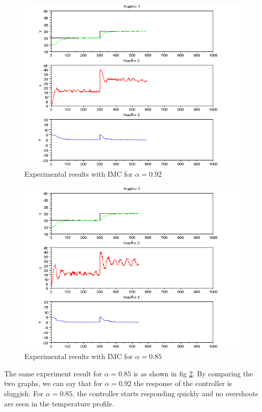 \begin{figure}
	\centering
		\includegraphics[width=\linewidth]{IMC/imc_092_resp.png}
	\caption{Experimental results with IMC for $\alpha=0.92$}
	\label{imc}
\end{figure}
\begin{figure}
	\centering
		\includegraphics[width=\linewidth]{IMC/imc_085_resp.png}
		\caption{Experimental results with IMC for $\alpha=0.85$}
	\label{fig:0.85}
\end{figure}

The same experiment result for $\alpha=0.85$ is as shown in fig \ref{fig:0.85}.
By comparing the two graphs, we can say that for $\alpha=0.92$ the response of the controller is sluggish. For $\alpha=0.85$,
the controller starts responding quickly and no overshoots are seen in the temperature profile.

